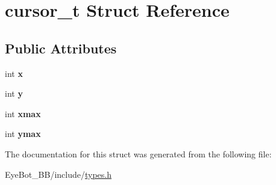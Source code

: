\hypertarget{structcursor__t}{\section{cursor\-\_\-t \-Struct \-Reference}
\label{structcursor__t}
}
\subsection*{\-Public \-Attributes}
\begin{DoxyCompactItemize}
\item 
\hypertarget{structcursor__t_a5bf0fa0d970cf757ca067a9516c6bd3c}{int {\bfseries x}}\label{structcursor__t_a5bf0fa0d970cf757ca067a9516c6bd3c}

\item 
\hypertarget{structcursor__t_ada185e800ee427f24c415fc58ae2aad0}{int {\bfseries y}}\label{structcursor__t_ada185e800ee427f24c415fc58ae2aad0}

\item 
\hypertarget{structcursor__t_ab8945425677e16de81a5828b7c981bb0}{int {\bfseries xmax}}\label{structcursor__t_ab8945425677e16de81a5828b7c981bb0}

\item 
\hypertarget{structcursor__t_aa6ca552ffc10899cae299204b371b5f3}{int {\bfseries ymax}}\label{structcursor__t_aa6ca552ffc10899cae299204b371b5f3}

\end{DoxyCompactItemize}


\-The documentation for this struct was generated from the following file\-:\begin{DoxyCompactItemize}
\item 
\-Eye\-Bot\-\_\-\-B\-B/include/\hyperlink{types_8h}{types.\-h}\end{DoxyCompactItemize}
